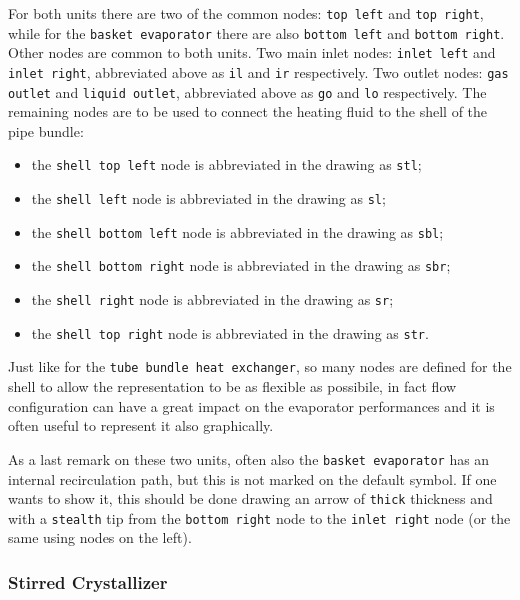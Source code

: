 \documentclass[12pt]{article}						%
\newcommand*{\chpn}[1]{\texttt{#1}}				%
\newcommand*{\chpp}[1]{\texttt{#1}}				%
\begin{document}
For both units there are two of the common nodes: \chpn{top left} and
\chpn{top right}, while for the \chpp{basket evaporator} there are also
\chpn{bottom left} and \chpn{bottom right}. Other nodes are common to both
units. Two main inlet nodes: \chpn{inlet left} and \chpn{inlet right},
abbreviated above as \chpn{il} and \chpn{ir} respectively. Two outlet nodes:
\chpn{gas outlet} and \chpn{liquid outlet}, abbreviated above as \chpn{go} and
\chpn{lo} respectively. The remaining nodes are to be used to connect the
heating fluid to the shell of the pipe bundle:
\begin{itemize}
	\item the \chpn{shell top left} node is abbreviated in the drawing as
		\chpn{stl};
	\item the \chpn{shell left} node is abbreviated in the drawing as
		\chpn{sl};
	\item the \chpn{shell bottom left} node is abbreviated in the drawing as
		\chpn{sbl};
	\item the \chpn{shell bottom right} node is abbreviated in the drawing as
		\chpn{sbr};
	\item the \chpn{shell right} node is abbreviated in the drawing as
		\chpn{sr};
	\item the \chpn{shell top right} node is abbreviated in the drawing as
		\chpn{str}.
\end{itemize}
Just like for the \chpp{tube bundle heat exchanger}, so many nodes are defined
for the shell to allow the representation to be as flexible as possibile, in
fact flow configuration can have a great impact on the evaporator performances
and it is often useful to represent it also graphically.

As a last remark on these two units, often also the \chpp{basket evaporator} has
an internal recirculation path, but this is not marked on the default symbol. If
one wants to show it, this should be done drawing an arrow of \verb|thick|
thickness and with a \verb|stealth| tip from the \chpn{bottom right} node to the
\chpn{inlet right} node (or the same using nodes on the left).

\subsubsection{Stirred Crystallizer}
\end{document}
